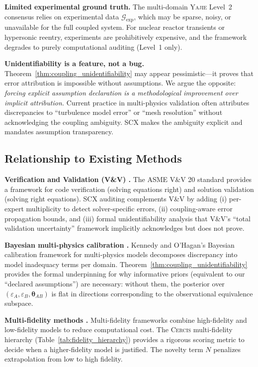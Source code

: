 \documentclass[11pt,a4paper]{article}
\theoremstyle{definition}
\newcommand{\Yajie}{\textsc{Yajie}}
\newcommand{\Cercis}{\textsc{Cercis}}
\newcommand{\SCX}{\textsc{SCX}}
\begin{document}
\textbf{Limited experimental ground truth.} The multi-domain \Yajie{} Level~2 consensus relies on experimental data $\mathcal{G}_{\mathrm{exp}}$, which may be sparse, noisy, or unavailable for the full coupled system. For nuclear reactor transients or hypersonic reentry, experiments are prohibitively expensive, and the framework degrades to purely computational auditing (Level~1 only).

\textbf{Unidentifiability is a feature, not a bug.} Theorem~\ref{thm:coupling_unidentifiability} may appear pessimistic---it proves that error attribution is impossible without assumptions. We argue the opposite: \textit{forcing explicit assumption declaration is a methodological improvement over implicit attribution.} Current practice in multi-physics validation often attributes discrepancies to ``turbulence model error'' or ``mesh resolution'' without acknowledging the coupling ambiguity. \SCX{} makes the ambiguity explicit and mandates assumption transparency.

\subsection{Relationship to Existing Methods }

\textbf{Verification and Validation (V\&V) \cite{Oberkampf2010}.} The ASME V\&V 20 standard provides a framework for code verification (solving equations right) and solution validation (solving right equations). \SCX{} auditing complements V\&V by adding (i) per-expert multiplicity to detect solver-specific errors, (ii) coupling-aware error propagation bounds, and (iii) formal unidentifiability analysis that V\&V's ``total validation uncertainty'' framework \cite{Coleman1999} implicitly acknowledges but does not prove.

\textbf{Bayesian multi-physics calibration \cite{Kennedy2001}.} Kennedy and O'Hagan's Bayesian calibration framework for multi-physics models decomposes discrepancy into model inadequacy terms per domain. Theorem~\ref{thm:coupling_unidentifiability} provides the formal underpinning for why informative priors (equivalent to our ``declared assumptions'') are necessary: without them, the posterior over $(\varepsilon_A, \varepsilon_B, \boldsymbol{\theta}_{AB})$ is flat in directions corresponding to the observational equivalence subspace.

\textbf{Multi-fidelity methods \cite{Peherstorfer2018}.} Multi-fidelity frameworks combine high-fidelity and low-fidelity models to reduce computational cost. The \Cercis{} multi-fidelity hierarchy (Table~\ref{tab:fidelity_hierarchy}) provides a rigorous scoring metric to decide when a higher-fidelity model is justified. The novelty term $N$ penalizes extrapolation from low to high fidelity.
\end{document}
